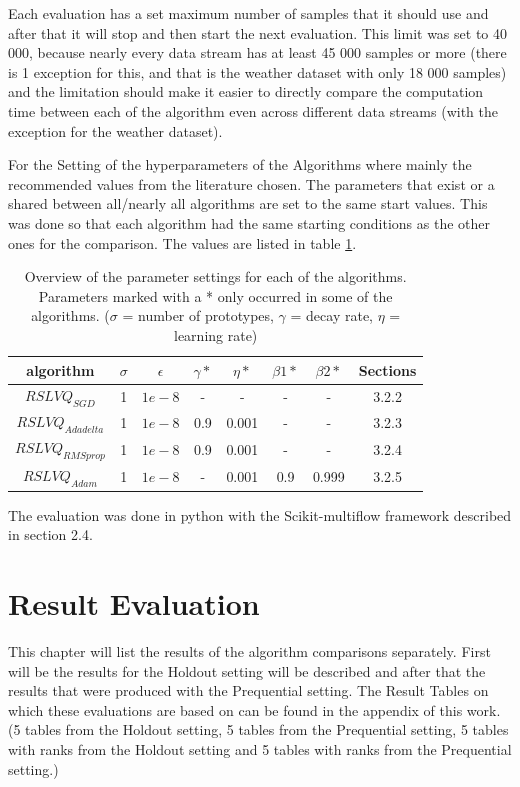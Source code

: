 \documentclass[12pt,oneside,a4paper,parskip]{scrbook}
\begin{document}
Each evaluation has a set maximum number of samples that it should use and after that it will stop and then start the next evaluation.
This limit was set to 40 000, because nearly every data stream has at least 45 000 samples or more (there is 1 exception for this,
and that is the weather dataset with only 18 000 samples) and the limitation should make it easier to directly compare the computation time 
between  each of the algorithm even across different data streams (with the exception for the weather dataset).

For the Setting of the hyperparameters of the Algorithms where mainly the recommended values from the literature chosen. 
The parameters that exist or a shared between all/nearly all algorithms are set to the same start values.
This was done so that each algorithm had the same starting conditions as the other ones for the comparison.
The values are listed in table \ref{tab:parameters}.

\begin{table}[H]
  \centering
  \begin{tabular} {|| c c c c c c c c||} 
    \hline
      algorithm & $\sigma$ & $\epsilon$ & $\gamma*$ & $\eta*$ & $\beta 1*$ & $\beta 2*$ & Sections\\
    \hline\hline
      $RSLVQ_\textit{SGD}$ & 1 & $1e-8$ & - & - & - & - & 3.2.2\\
    \hline 
      $RSLVQ_\textit{Adadelta}$ & 1 & $1e-8$ & 0.9 & 0.001 & - & - & 3.2.3\\
    \hline
      $RSLVQ_\textit{RMSprop}$ & 1 & $1e-8$ & 0.9 & 0.001 & - & - & 3.2.4\\
    \hline
      $RSLVQ_\textit{Adam}$ & 1 & $1e-8$ & - & 0.001 & 0.9 & 0.999 & 3.2.5\\
    \hline
  \end{tabular} 
  \caption{Overview of the parameter settings for each of the algorithms. Parameters marked with a * only occurred in some of the algorithms.
  ($\sigma$ = number of prototypes, $\gamma$ = decay rate, $\eta$ = learning rate)}
  \label{tab:parameters}
\end{table}

The evaluation was done in python with the Scikit-multiflow framework described in section 2.4.

\chapter{Result Evaluation}
This chapter will list the results of the algorithm comparisons separately.
First will be the results for the Holdout setting will be described and after that the results that were produced with the 
Prequential setting. The Result Tables on which these evaluations are based on can be found in the appendix of this work.
(5 tables from the Holdout setting, 5 tables from the Prequential setting, 5 tables with ranks from the Holdout setting
and 5 tables with ranks from the Prequential setting.) 
\end{document}
